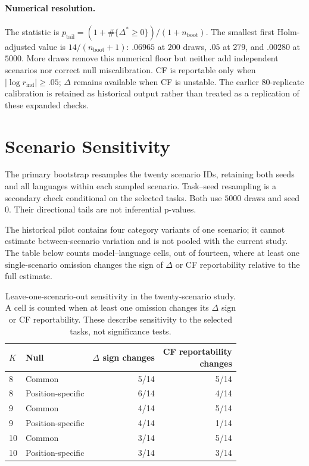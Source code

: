 \documentclass[11pt]{article}
\begin{document}
\paragraph{Numerical resolution.} The statistic is
$p_{\mathrm{tail}}=(1+\#\{\Delta^*\geq0\})/(1+n_{\mathrm{boot}})$.
The smallest first Holm-adjusted value is $14/(n_{\mathrm{boot}}+1)$:
$.06965$ at $200$ draws, $.05$ at $279$, and $.00280$ at $5000$.
More draws remove this numerical floor but neither add independent scenarios
nor correct null miscalibration. CF is reportable only when
$|\log r_{\mathrm{ind}}|\geq.05$; $\Delta$ remains available when CF is unstable.
The earlier $80$-replicate calibration is retained as historical output rather
than treated as a replication of these expanded checks.

\section{Scenario Sensitivity}
\label{app:task_sensitivity}
The primary bootstrap resamples the twenty scenario IDs, retaining both
seeds and all languages within each sampled scenario. Task--seed resampling
is a secondary check conditional on the selected tasks. Both use $5000$
draws and seed $0$. Their directional tails are not inferential p-values.

The historical pilot contains four category variants of one scenario;
it cannot estimate between-scenario variation and is not pooled with the
current study. The table below counts model--language cells, out of fourteen,
where at least one single-scenario omission changes the sign of $\Delta$
or CF reportability relative to the full estimate.

\begin{table}[ht]\centering
\small
\begin{tabular}{llrr}
\toprule
$K$ & Null & \shortstack{$\Delta$ sign\\changes} & \shortstack{CF reportability\\changes} \\
\midrule
8 & Common & 5/14 & 5/14 \\
8 & Position-specific & 6/14 & 4/14 \\
9 & Common & 4/14 & 5/14 \\
9 & Position-specific & 4/14 & 1/14 \\
10 & Common & 3/14 & 5/14 \\
10 & Position-specific & 3/14 & 3/14 \\
\bottomrule
\end{tabular}
\caption{Leave-one-scenario-out sensitivity in the twenty-scenario study. A cell is counted when at least one omission changes its
$\Delta$ sign or CF reportability. These describe sensitivity to the selected tasks,
not significance tests.}
\label{tab:task_sensitivity}
\end{table}
\end{document}

